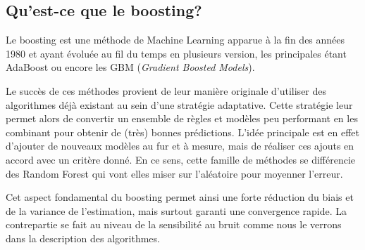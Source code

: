 \subsection{Qu'est-ce que le boosting?}
Le boosting est une méthode de Machine Learning apparue à la fin des années 1980 et ayant évoluée au fil du temps en plusieurs version, les principales étant AdaBoost ou encore les GBM (\textit{Gradient Boosted Models}). 

Le succès de ces méthodes provient de leur manière originale d'utiliser des algorithmes déjà existant au sein d'une stratégie adaptative. Cette stratégie leur permet alors de convertir un ensemble de règles et modèles peu performant en les combinant pour obtenir de (très) bonnes prédictions. L'idée principale est en effet d'ajouter de nouveaux modèles au fur et à mesure, mais de réaliser ces ajouts en accord avec un critère donné. En ce sens, cette famille de méthodes se différencie des Random Forest qui vont elles miser sur l'aléatoire pour moyenner l'erreur.

Cet aspect fondamental du boosting permet ainsi une forte réduction du biais et de la variance de l'estimation, mais surtout garanti une convergence rapide. La contrepartie se fait au niveau de la sensibilité au bruit comme nous le verrons dans la description des algorithmes.